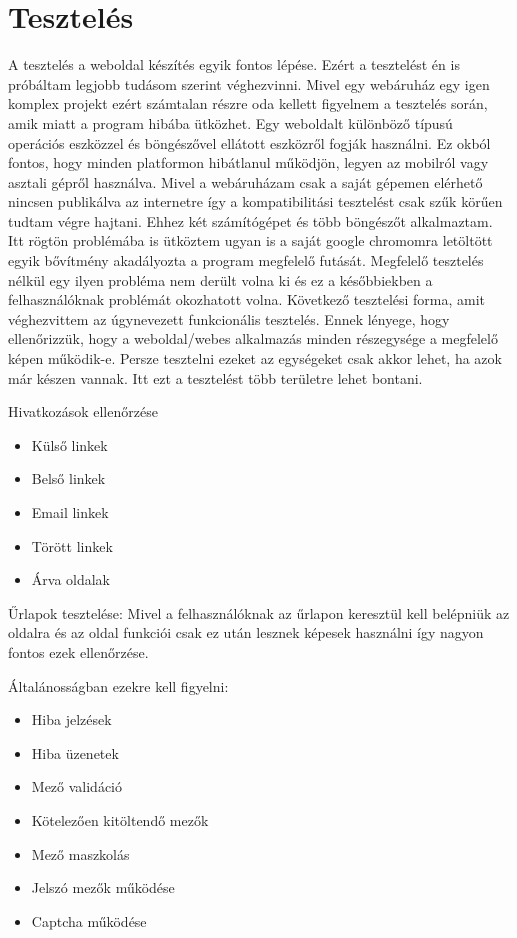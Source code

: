 \chapter{Tesztelés}

A tesztelés a weboldal készítés egyik fontos lépése. Ezért a tesztelést én is próbáltam legjobb tudásom szerint véghezvinni. Mivel egy webáruház egy igen komplex projekt ezért számtalan részre oda kellett figyelnem a tesztelés során, amik miatt a program hibába ütközhet. Egy weboldalt különböző típusú operációs eszközzel és böngészővel ellátott eszközről fogják használni. Ez okból fontos, hogy minden platformon hibátlanul működjön, legyen az mobilról vagy asztali gépről használva. Mivel a webáruházam csak a saját gépemen elérhető nincsen publikálva az internetre így a kompatibilitási tesztelést csak szűk körűen tudtam végre hajtani. Ehhez két számítógépet és több böngészőt alkalmaztam. Itt rögtön problémába is ütköztem ugyan is a saját google chromomra letöltött egyik bővítmény akadályozta a program megfelelő futását. Megfelelő tesztelés nélkül egy ilyen probléma nem derült volna ki és ez a későbbiekben a felhasználóknak problémát okozhatott volna. Következő tesztelési forma, amit véghezvittem az úgynevezett funkcionális tesztelés. Ennek lényege, hogy ellenőrizzük, hogy a weboldal/webes alkalmazás minden részegysége a megfelelő képen működik-e. Persze tesztelni ezeket az egységeket csak akkor lehet, ha azok már készen vannak. Itt ezt a tesztelést több területre lehet bontani.\cite{23}

Hivatkozások ellenőrzése
\begin{itemize}
    \item Külső linkek
    \item Belső linkek
    \item Email linkek
    \item Törött linkek
    \item Árva oldalak
\end{itemize}

Űrlapok tesztelése:
Mivel a felhasználóknak az űrlapon keresztül kell belépniük az oldalra és az oldal funkciói csak ez után lesznek képesek használni így nagyon fontos ezek ellenőrzése.

Általánosságban ezekre kell figyelni:
\begin{itemize}
    \item Hiba jelzések
    \item Hiba üzenetek
    \item Mező validáció
    \item Kötelezően kitöltendő mezők
    \item Mező maszkolás
    \item Jelszó mezők működése
    \item Captcha működése
\end{itemize}


